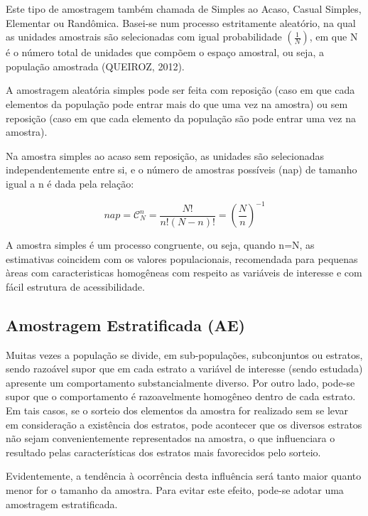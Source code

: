 \inic Este tipo de amostragem também chamada de Simples ao Acaso,
Casual Simples, Elementar ou Randômica. Basei-se num processo
estritamente aleatório, na qual as unidades amostrais são
selecionadas com igual probabilidade $(\frac{1}{N})$, em que N é o
número total de unidades que compõem o espaço amostral, ou seja, a
população amostrada (QUEIROZ, 2012).\vskip0.3cm


A amostragem aleatória simples pode ser feita com reposição (caso em
que cada elementos da população pode entrar mais do que uma vez na
amostra) ou sem reposição (caso em que cada elemento da população
são pode entrar uma vez na amostra).\vskip0.3cm



Na amostra simples ao acaso sem reposição, as unidades são selecionadas independentemente entre si, e o número de amostras possíveis (nap) de tamanho igual a n é dada pela relação:


\begin{equation}\label{nap}
    nap=\mathcal{C}_{N}^{n}=\frac{N!}{n!(N-n)!}=\left(\frac{N}{n}\right)^{-1}
\end{equation}

A amostra simples é um processo congruente, ou seja, quando n=N, as estimativas coincidem com os valores populacionais, recomendada para pequenas àreas com caracteristicas homogêneas com respeito as variáveis de interesse e com fácil estrutura de acessibilidade.

\subsection{Amostragem Estratificada (AE)}

\inic Muitas vezes a população se divide, em sub-populações,
subconjuntos ou estratos, sendo razoável supor que em cada estrato
a variável de interesse (sendo estudada) apresente um
comportamento substancialmente diverso. Por outro lado, pode-se
supor que o comportamento é razoavelmente homogêneo dentro de cada
estrato. Em tais casos, se o sorteio dos elementos da amostra for
realizado sem se levar em consideração a existência dos estratos,
pode acontecer que os diversos estratos não sejam convenientemente
representados na amostra, o que influenciara o resultado pelas
características dos estratos mais favorecidos pelo sorteio.\vskip0.3cm

Evidentemente, a tendência à ocorrência desta influência será
tanto maior quanto menor for o tamanho da amostra. Para evitar
este efeito, pode-se adotar uma amostragem estratificada.\vskip0.3cm

